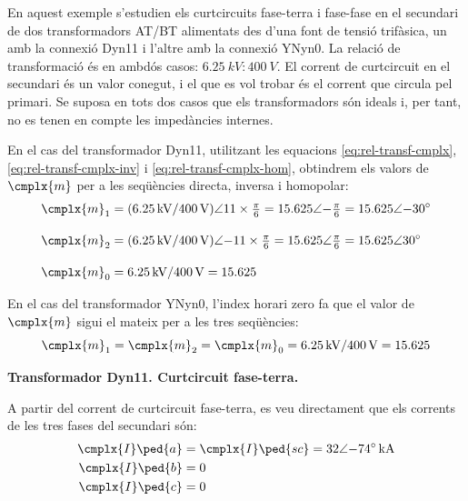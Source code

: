 	
\begin{exemple}[\CCasimSecTrafo{}]\label{ex:IccTrafos}
	\addcontentsxms{\CCasimSecTrafo}
    En aquest exemple s'estudien els curtcircuits fase-terra i fase-fase en el secundari de dos transformadors AT/BT alimentats des d'una font de tensió trifàsica, un amb la connexió Dyn11 i l'altre amb la connexió YNyn0. La relació de transformació és en ambdós casos: $\qty{6,25}{kV}\!:\!\qty{400}{V}$. El corrent de curtcircuit en el secundari és un valor conegut, i el que es vol trobar és el corrent que circula pel primari. Se suposa en tots dos casos que els transformadors són ideals i, per tant, no es tenen en compte les impedàncies internes.


    En el cas del transformador Dyn11, utilitzant les equacions \eqref{eq:rel-transf-cmplx}, \eqref{eq:rel-transf-cmplx-inv} i \eqref{eq:rel-transf-cmplx-hom}, obtindrem els valors de $\cmplx{m}$ per a les seqüències directa, inversa i homopolar:
    \begin{align*}
        \cmplx{m}_1 &= (\qty{6,25}{kV} / \qty{400}{V})\angle 11\times\tfrac{\pi}{6} =
        \num{15,625}\angle{-\tfrac{\pi}{6}} = \complexnum{15,625:-30} \\[1em]
        \cmplx{m}_2 &= (\qty{6,25}{kV} / \qty{400}{V})\angle {-11}\times\tfrac{\pi}{6} =
        \num{15,625}\angle \tfrac{\pi}{6} =\complexnum{15,625:30}  \\[1em]
        \cmplx{m}_0 &= \qty{6,25}{kV} / \qty{400}{V} = \num{15,625}
    \end{align*}

    En el cas del transformador YNyn0, l'index horari zero fa que el valor de $\cmplx{m}$ sigui el mateix per a les tres seqüències:
    \[
        \cmplx{m}_1 = \cmplx{m}_2 = \cmplx{m}_0 = \qty{6,25}{kV} / \qty{400}{V} = \num{15,625}
    \]

   \textbf{ Transformador Dyn11. Curtcircuit fase-terra.}

    \begin{center}
       
    \end{center}

    A partir del corrent de curtcircuit fase-terra, es veu directament que els corrents de les tres fases del secundari són:
    \begin{align*}
        \cmplx{I}\ped{a} &= \cmplx{I}\ped{sc} = \complexqty{32:-74}{kA} \\
        \cmplx{I}\ped{b} &= 0  \\
        \cmplx{I}\ped{c} &= 0
    \end{align*}


\end{exemple}
